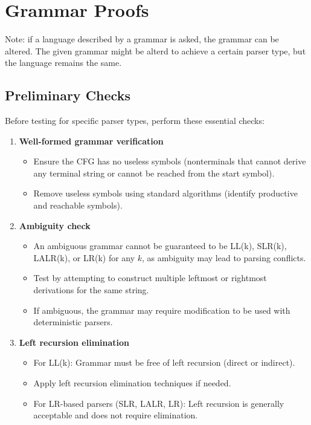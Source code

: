 
\section{Grammar Proofs}

Note: if a language described by a grammar is asked, the grammar can be altered. The given grammar might be alterd to achieve a certain parser type, but the language remains the same.

\subsection{Preliminary Checks}

Before testing for specific parser types, perform these essential checks:

\begin{enumerate}
    \item \textbf{Well-formed grammar verification}
    \begin{itemize}
        \item Ensure the CFG has no useless symbols (nonterminals that cannot derive any terminal string or cannot be reached from the start symbol).
        \item Remove useless symbols using standard algorithms (identify productive and reachable symbols).
    \end{itemize}

    \item \textbf{Ambiguity check}
    \begin{itemize}
        \item An ambiguous grammar cannot be guaranteed to be LL(k), SLR(k), LALR(k), or LR(k) for any $k$, as ambiguity may lead to parsing conflicts.
        \item Test by attempting to construct multiple leftmost or rightmost derivations for the same string.
        \item If ambiguous, the grammar may require modification to be used with deterministic parsers.
    \end{itemize}

    \item \textbf{Left recursion elimination}
    \begin{itemize}
        \item For LL(k): Grammar must be free of left recursion (direct or indirect).
        \item Apply left recursion elimination techniques if needed.
        \item For LR-based parsers (SLR, LALR, LR): Left recursion is generally acceptable and does not require elimination.
    \end{itemize}
\end{enumerate}

